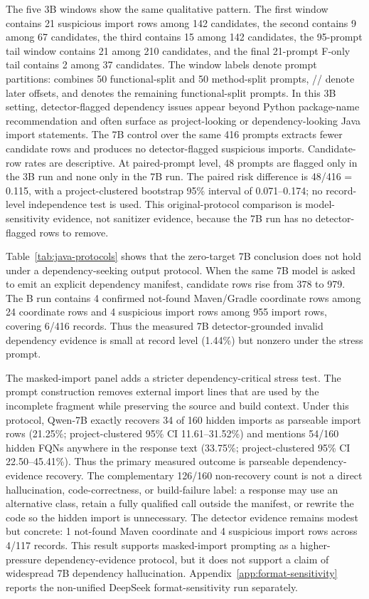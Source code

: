 \documentclass[pdflatex,sn-basic]{sn-jnl}
\newcommand{\codeid}[1]{\texttt{\detokenize{#1}}}
\begin{document}
The five 3B windows show the same qualitative pattern. The first window contains 21 suspicious import rows among 142 candidates, the second contains 9 among 67 candidates, the third contains 15 among 142 candidates, the 95-prompt tail window contains 21 among 210 candidates, and the final 21-prompt F-only tail contains 2 among 37 candidates. The window labels denote prompt partitions: \codeid{FM50} combines 50 functional-split and 50 method-split prompts, \codeid{Off50}/\codeid{Off100}/\codeid{Off150} denote later offsets, and \codeid{F-tail} denotes the remaining functional-split prompts. In this 3B setting, detector-flagged dependency issues appear beyond Python package-name recommendation and often surface as project-looking or dependency-looking Java import statements. The 7B control over the same 416 prompts extracts fewer candidate rows and produces no detector-flagged suspicious imports. Candidate-row rates are descriptive. At paired-prompt level, 48 prompts are flagged only in the 3B run and none only in the 7B run. The paired risk difference is 48/416 = 0.115, with a project-clustered bootstrap 95\% interval of 0.071--0.174; no record-level independence test is used. This original-protocol comparison is model-sensitivity evidence, not sanitizer evidence, because the 7B run has no detector-flagged rows to remove.

Table~\ref{tab:java-protocols} shows that the zero-target 7B conclusion does not hold under a dependency-seeking output protocol. When the same 7B model is asked to emit an explicit dependency manifest, candidate rows rise from 378 to 979. The B run contains 4 confirmed not-found Maven/Gradle coordinate rows among 24 coordinate rows and 4 suspicious import rows among 955 import rows, covering 6/416 records. Thus the measured 7B detector-grounded invalid dependency evidence is small at record level (1.44\%) but nonzero under the stress prompt.

The masked-import panel adds a stricter dependency-critical stress test. The prompt construction removes external import lines that are used by the incomplete fragment while preserving the source and build context. Under this protocol, Qwen-7B exactly recovers 34 of 160 hidden imports as parseable import rows (21.25\%; project-clustered 95\% CI 11.61--31.52\%) and mentions 54/160 hidden FQNs anywhere in the response text (33.75\%; project-clustered 95\% CI 22.50--45.41\%). Thus the primary measured outcome is parseable dependency-evidence recovery. The complementary 126/160 non-recovery count is not a direct hallucination, code-correctness, or build-failure label: a response may use an alternative class, retain a fully qualified call outside the manifest, or rewrite the code so the hidden import is unnecessary. The detector evidence remains modest but concrete: 1 not-found Maven coordinate and 4 suspicious import rows across 4/117 records. This result supports masked-import prompting as a higher-pressure dependency-evidence protocol, but it does not support a claim of widespread 7B dependency hallucination. Appendix~\ref{app:format-sensitivity} reports the non-unified DeepSeek format-sensitivity run separately.
\end{document}
